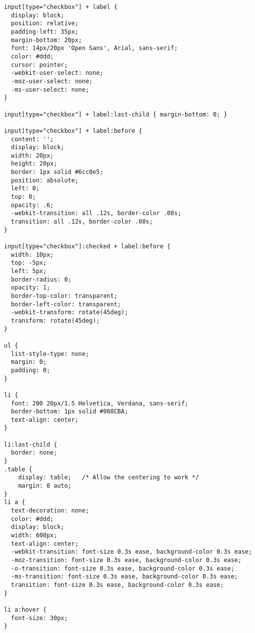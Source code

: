 \documentclass{article}
\begin{document}
\begin{verbatim}
input[type="checkbox"] + label {
  display: block;
  position: relative;
  padding-left: 35px;
  margin-bottom: 20px;
  font: 14px/20px 'Open Sans', Arial, sans-serif;
  color: #ddd;
  cursor: pointer;
  -webkit-user-select: none;
  -moz-user-select: none;
  -ms-user-select: none;
}

input[type="checkbox"] + label:last-child { margin-bottom: 0; }

input[type="checkbox"] + label:before {
  content: '';
  display: block;
  width: 20px;
  height: 20px;
  border: 1px solid #6cc0e5;
  position: absolute;
  left: 0;
  top: 0;
  opacity: .6;
  -webkit-transition: all .12s, border-color .08s;
  transition: all .12s, border-color .08s;
}

input[type="checkbox"]:checked + label:before {
  width: 10px;
  top: -5px;
  left: 5px;
  border-radius: 0;
  opacity: 1;
  border-top-color: transparent;
  border-left-color: transparent;
  -webkit-transform: rotate(45deg);
  transform: rotate(45deg);
}

ul {
  list-style-type: none;
  margin: 0;
  padding: 0;
}
 
li {
  font: 200 20px/1.5 Helvetica, Verdana, sans-serif;
  border-bottom: 1px solid #008CBA;
  text-align: center;
}
 
li:last-child {
  border: none;
}
.table {
	display: table;   /* Allow the centering to work */
	margin: 0 auto;
}
li a {
  text-decoration: none;
  color: #ddd;
  display: block;
  width: 600px;
  text-align: center;
  -webkit-transition: font-size 0.3s ease, background-color 0.3s ease;
  -moz-transition: font-size 0.3s ease, background-color 0.3s ease;
  -o-transition: font-size 0.3s ease, background-color 0.3s ease;
  -ms-transition: font-size 0.3s ease, background-color 0.3s ease;
  transition: font-size 0.3s ease, background-color 0.3s ease;
}
 
li a:hover {
  font-size: 30px;
}
\end{verbatim}
\end{document}
